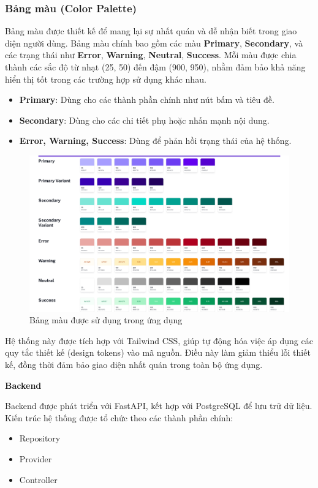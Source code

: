 \subsubsection*{Bảng màu (Color Palette)}
Bảng màu được thiết kế để mang lại sự nhất quán và dễ nhận biết trong giao diện người dùng. Bảng màu chính bao gồm các màu \textbf{Primary}, \textbf{Secondary}, và các trạng thái như \textbf{Error}, \textbf{Warning}, \textbf{Neutral}, \textbf{Success}. Mỗi màu được chia thành các sắc độ từ nhạt (25, 50) đến đậm (900, 950), nhằm đảm bảo khả năng hiển thị tốt trong các trường hợp sử dụng khác nhau.

\begin{itemize}
    \item \textbf{Primary}: Dùng cho các thành phần chính như nút bấm và tiêu đề.
    \item \textbf{Secondary}: Dùng cho các chi tiết phụ hoặc nhấn mạnh nội dung.
    \item \textbf{Error, Warning, Success}: Dùng để phản hồi trạng thái của hệ thống.
\end{itemize}

\begin{figure}[H]
    \centering
    \includegraphics[scale=0.15]{Images/Implement/Colors.jpg}
    \caption{Bảng màu được sử dụng trong ứng dụng}
\end{figure}

Hệ thống này được tích hợp với Tailwind CSS, giúp tự động hóa việc áp dụng các quy tắc thiết kế (design tokens) vào mã nguồn. Điều này làm giảm thiểu lỗi thiết kế, đồng thời đảm bảo giao diện nhất quán trong toàn bộ ứng dụng.


\textbf{Backend}

Backend được phát triển với FastAPI, kết hợp với PostgreSQL để lưu trữ dữ liệu. Kiến trúc hệ thống được tổ chức theo các thành phần chính:
\begin{itemize}
    \item Repository
    \item Provider
    \item Controller
\end{itemize}


